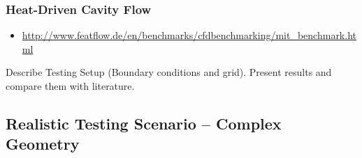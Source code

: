       \subsubsection{Heat-Driven Cavity Flow}
        \begin{itemize}
          \item \url{http://www.featflow.de/en/benchmarks/cfdbenchmarking/mit_benchmark.html}
        \end{itemize}
        Describe Testing Setup (Boundary conditions and grid). Present results and compare them with literature.
    \subsection{Realistic Testing Scenario -- Complex Geometry}
